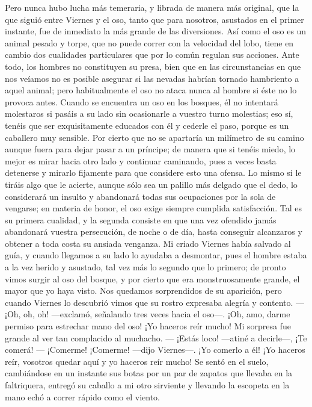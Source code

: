 \documentclass{novela}
\begin{document}
    Pero nunca hubo lucha más temeraria, y librada de manera más original, que la que siguió entre Viernes y el oso, tanto que para nosotros, asustados en el primer instante, fue de inmediato la más grande de las diversiones. Así como el oso es un animal pesado y torpe, que no puede correr con la velocidad del lobo, tiene en cambio dos cualidades particulares que por lo común regulan sus acciones. Ante todo, los hombres no constituyen su presa, bien que en las circunstancias en que nos veíamos no es posible asegurar si las nevadas habrían tornado hambriento a aquel animal; pero habitualmente el oso no ataca nunca al hombre si éste no lo provoca antes. Cuando se encuentra un oso en los bosques, él no intentará molestaros si pasáis a su lado sin ocasionarle a vuestro turno molestias; eso sí, tenéis que ser exquisitamente educados con él y cederle el paso, porque es un caballero muy sensible. Por cierto que no se apartaría un milímetro de su camino aunque fuera para dejar pasar a un príncipe; de manera que si tenéis miedo, lo mejor es mirar hacia otro lado y continuar caminando, pues a veces basta detenerse y mirarlo fijamente para que considere esto una ofensa. Lo mismo si le tiráis algo que le acierte, aunque sólo sea un palillo más delgado que el dedo, lo considerará un insulto y abandonará todas sus ocupaciones por la sola de vengarse; en materia de honor, el oso exige siempre cumplida satisfacción. Tal es su primera cualidad, y la segunda consiste en que una vez ofendido jamás abandonará vuestra persecución, de noche o de día, hasta conseguir alcanzaros y obtener a toda costa su ansiada venganza.
    Mi criado Viernes había salvado al guía, y cuando llegamos a su lado lo ayudaba a desmontar, pues el hombre estaba a la vez herido y asustado, tal vez más lo segundo que lo primero; de pronto vimos surgir al oso del bosque, y por cierto que era monstruosamente grande, el mayor que yo haya visto. Nos quedamos sorprendidos de su aparición, pero cuando Viernes lo descubrió vimos que su rostro expresaba alegría y contento.
    — ¡Oh, oh, oh! —exclamó, señalando tres veces hacia el oso—. ¡Oh, amo, darme permiso para estrechar mano del oso! ¡Yo haceros reír mucho! Mi  sorpresa fue  grande  al  ver tan complacido  al muchacho.
    — ¡Estás loco! —atiné a decirle—, ¡Te comerá!
    — ¡Comerme! ¡Comerme! —dijo Viernes—. ¡Yo comerlo a él! ¡Yo haceros reír, vosotros quedar aquí y yo haceros reír mucho!
    Se sentó en el suelo, cambiándose en un instante sus botas por un par de zapatos que llevaba en la faltriquera, entregó su caballo a mi otro sirviente y llevando la escopeta en la mano echó a correr rápido como el viento.
\end{document}
